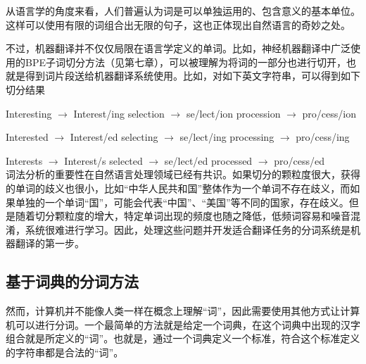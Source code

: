 \parinterval 从语言学的角度来看，人们普遍认为词是可以单独运用的、包含意义的基本单位。这样可以使用有限的词组合出无限的句子，这也正体现出自然语言的奇妙之处。

\parinterval 不过，机器翻译并不仅仅局限在语言学定义的单词。比如，神经机器翻译中广泛使用的BPE子词切分方法（见第七章），可以被理解为将词的一部分也进行切开，也就是得到词片段送给机器翻译系统使用。比如，对如下英文字符串，可以得到如下切分结果
\vspace{0.5em}

\parinterval Interesting \; $\to$ \; Interest/ing  selection \hspace{0.08em} $\to$ \;se/lect/ion  procession \hspace{0.43em} $\to$ \; pro/cess/ion

\parinterval Interested \hspace{0.62em} $\to$ \; Interest/ed   selecting \hspace{0.34em} $\to$ \; se/lect/ing  processing \hspace{0.22em} $\to$ \; pro/cess/ing

\parinterval Interests \hspace{1.17em} $\to$ \; Interest/s   selected \hspace{1.24em} $\to$ \; se/lect/ed   processed \hspace{0.82em} $\to$ \; pro/cess/ed \\


\parinterval 词法分析的重要性在自然语言处理领域已经有共识。如果切分的颗粒度很大，获得的单词的歧义也很小，比如``中华人民共和国''整体作为一个单词不存在歧义，而如果单独的一个单词``国''，可能会代表``中国''、``美国''等不同的国家，存在歧义。但是随着切分颗粒度的增大，特定单词出现的频度也随之降低，低频词容易和噪音混淆，系统很难进行学习。因此，处理这些问题并开发适合翻译任务的分词系统是机器翻译的第一步。


\subsection{基于词典的分词方法}
\parinterval 然而，计算机并不能像人类一样在概念上理解``词''，因此需要使用其他方式让计算机可以进行分词。一个最简单的方法就是给定一个词典，在这个词典中出现的汉字组合就是所定义的``词''。也就是，通过一个词典定义一个标准，符合这个标准定义的字符串都是合法的``词''。

